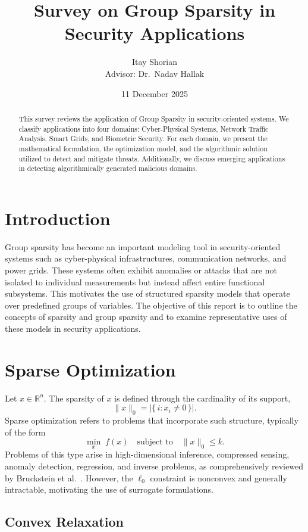 \documentclass[12pt]{article}
\title{\textbf{Survey on Group Sparsity in Security Applications}}
\author{Itay Shorian \\ Advisor: Dr.\ Nadav Hallak}
\date{11 December 2025}
\begin{document}
\maketitle
\begin{abstract}
\noindent
This survey reviews the application of Group Sparsity in security-oriented systems. We classify applications into four domains: Cyber-Physical Systems, Network Traffic Analysis, Smart Grids, and Biometric Security. For each domain, we present the mathematical formulation, the optimization model, and the algorithmic solution utilized to detect and mitigate threats. Additionally, we discuss emerging applications in detecting algorithmically generated malicious domains.
\end{abstract}

\section{Introduction}

Group sparsity has become an important modeling tool in security-oriented systems such as cyber-physical infrastructures, communication networks, and power grids. These systems often exhibit anomalies or attacks that are not isolated to individual measurements but instead affect entire functional subsystems. This motivates the use of structured sparsity models that operate over predefined groups of variables. The objective of this report is to outline the concepts of sparsity and group sparsity and to examine representative uses of these models in security applications.

\section{Sparse Optimization}

Let $x \in \mathbb{R}^n$. The sparsity of $x$ is defined through the cardinality of its support,
\[
\|x\|_0 = |\{\, i : x_i \neq 0 \,\}|.
\]
Sparse optimization refers to problems that incorporate such structure, typically of the form
\[
\min_{x} \; f(x) \quad \text{subject to} \quad \|x\|_0 \le k.
\]
Problems of this type arise in high-dimensional inference, compressed sensing, anomaly detection, regression, and inverse problems, as comprehensively reviewed by Bruckstein et al.~\cite{BDL}. However, the $\ell_0$ constraint is nonconvex and generally intractable, motivating the use of surrogate formulations.

\subsection{Convex Relaxation}
\end{document}
